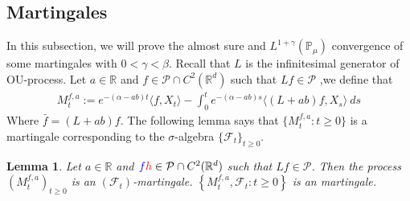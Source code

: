 \documentclass[12pt,oneside,english]{amsart}
\theoremstyle{plain}
\newtheorem{lem}[thm]{Lemma}
\theoremstyle{definition}
\numberwithin{equation}{section}
\newcommand{\added}[1]{{\color{blue}#1}}\newcommand{\deleted}[1]{{\color{red}#1}}
\begin{document}
\subsection{Martingales}
    In this subsection, we will prove the almost sure and $L^{1+\gamma}(\mathbb{P}_{\mu})$ convergence of some martingales with $0<\gamma<\beta$. Recall that $L$ is the infinitesimal generator of OU-process. Let $a\in \mathbb{R}$ and $f\in \mathcal{P}\cap C^2(\mathbb{R}^d)$ such that $Lf \in \mathcal{P}$ ,we define that
\begin{align}
\label{defmartingale}
    M_t^{f,a}:=e^{-(\alpha-ab)t}\langle f,X_t\rangle-\int_0^t e^{-(\alpha-ab)s}\langle (L+ab)f, X_s\rangle~ ds
\end{align}
    \deleted{Where $\bar{f}=(L+ab)f$.}
    The following lemma says that $\{M_t^{f,a}: t\geq 0\}$ is a martingale corresponding to the $\sigma$-algebra $\{\mathcal{F}_t\}_{t\geq 0}$.
\begin{lem}
\label{lemma25}
    Let $a\in \mathbb R$ and $\added{f} \deleted{h}\in \mathcal{P}\cap C^2(\mathbb{R}^d)$ such that $Lf \in \mathcal{P}$. Then the process \added{$(M_t^{f,a})_{t\geq 0}$ is an $(\mathscr F_t)$-martingale.} \deleted{$\left\{M_t^{f,a}, \mathcal{F}_t:t\geq 0\right\}$ is an martingale.}
\end{lem}
\end{document}
